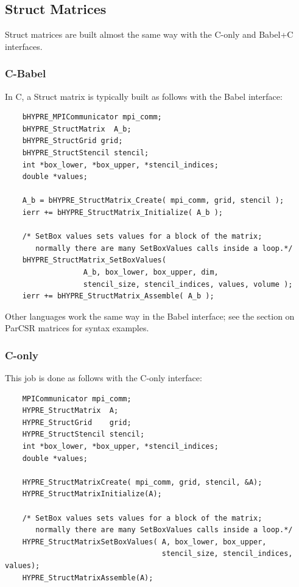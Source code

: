 \subsection{Struct Matrices}

Struct matrices are built almost the same way with
the C-only and Babel+C interfaces.

\subsubsection{C-Babel}

In C, a Struct  matrix is typically built as follows with
the Babel interface:

\begin{verbatim}
    bHYPRE_MPICommunicator mpi_comm;
    bHYPRE_StructMatrix  A_b;
    bHYPRE_StructGrid grid;
    bHYPRE_StructStencil stencil;
    int *box_lower, *box_upper, *stencil_indices;
    double *values;

    A_b = bHYPRE_StructMatrix_Create( mpi_comm, grid, stencil );
    ierr += bHYPRE_StructMatrix_Initialize( A_b );

    /* SetBox values sets values for a block of the matrix;
       normally there are many SetBoxValues calls inside a loop.*/
    bHYPRE_StructMatrix_SetBoxValues(
                  A_b, box_lower, box_upper, dim,
                  stencil_size, stencil_indices, values, volume );
    ierr += bHYPRE_StructMatrix_Assemble( A_b );
\end{verbatim}


Other languages work the same way in the Babel interface; see the
section on ParCSR matrices for syntax examples.

\subsubsection{C-only}

This job is done as follows with the C-only interface:

\begin{verbatim}
    MPICommunicator mpi_comm;
    HYPRE_StructMatrix  A;
    HYPRE_StructGrid    grid;
    HYPRE_StructStencil stencil;
    int *box_lower, *box_upper, *stencil_indices;
    double *values;

    HYPRE_StructMatrixCreate( mpi_comm, grid, stencil, &A);
    HYPRE_StructMatrixInitialize(A);

    /* SetBox values sets values for a block of the matrix;
       normally there are many SetBoxValues calls inside a loop.*/
    HYPRE_StructMatrixSetBoxValues( A, box_lower, box_upper,
                                    stencil_size, stencil_indices, values);
    HYPRE_StructMatrixAssemble(A);
\end{verbatim}


